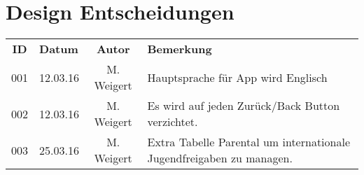 \section{Design Entscheidungen}

\begin{tabular}{|c|l|c|l|}
	\rowcolor{black} {\color{white}\textbf{ID}} & {\color{white}\textbf{Datum}} & {\color{white}\textbf{Autor}} & {\color{white}\textbf{Bemerkung}} \\
	001 & 12.03.16 & M. Weigert & Hauptsprache für App wird Englisch \\ \hline
	\rowcolor{DarkSeaGreen} 002 & 12.03.16 & M. Weigert & Es wird auf jeden Zurück/Back Button verzichtet. \\ \hline
	003 & 25.03.16 & M. Weigert & Extra Tabelle Parental um internationale Jugendfreigaben zu managen. \\ \hline
\end{tabular}